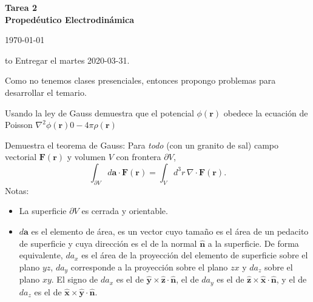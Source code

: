 \documentclass{exam}
\begin{document}
\begin{center}
\bf\large Tarea 2\\
Propedéutico Electrodinámica\\
\date{2020-03-10}
\today\\[20pt]
\end{center}
\hbox to \textwidth{Nombre: \enspace\hrulefill}
Entregar el martes 2020-03-31.

Como no tenemos clases presenciales, entonces propongo problemas para
desarrollar el temario.

\begin{questions}
  \question Usando la ley de Gauss demuestra que el potencial
  $\phi(\bm r)$ obedece la ecuación de Poisson $\nabla^2\phi(\bm
  r)0-4\pi\rho(\bm r)$

  \question Demuestra el teorema de Gauss: Para {\em todo} (con un
  granito de sal) campo vectorial $\bm F(\bm r)$ y volumen $V$
  con frontera $\partial V$,
  $$
  \int_{\partial V}d\bm a\cdot\bm F(\bm r)=\int_V d^3 r\, \nabla\cdot\bm
  F(\bm r).
  $$
  Notas:
  \begin{itemize}
  \item La superficie $\partial V$ es cerrada y orientable.
  \item $d\bm a$ es el elemento de área, es un vector cuyo tamaño es
    el área de un pedacito de superficie y cuya dirección es el de la
    normal $\hat {\bm n}$ a
    la superficie. De forma equivalente, $da_x$ es el área de la proyección del elemento de
    superficie sobre el plano $yz$, $da_y$ corresponde a la proyección
    sobre el plano $zx$ y $da_z$ sobre el plano $xy$. El signo de
    $da_x$ es el de $\hat{\bm  y}\times\hat{\bm z}\cdot\hat{\bm  n}$,
    el de $da_y$ es el de $\hat{\bm  z}\times\hat {\bm x}\cdot\hat{\bm
      n}$,
    y el de $da_z$ es el de $\hat{\bm  x}\times\hat{\bm  y}\cdot\hat{\bm n}$.
  \end{itemize}


\end{questions}
\end{document}

